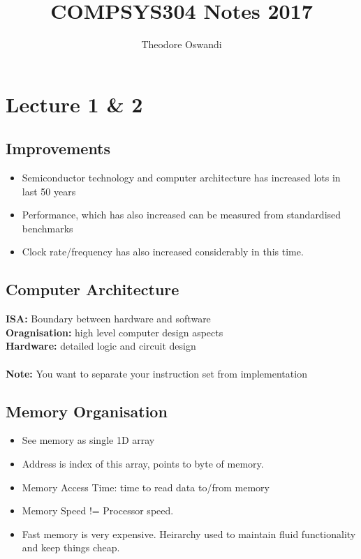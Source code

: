 \documentclass{article}
\title{COMPSYS304 Notes 2017}
\author{Theodore Oswandi}
\newcommand\tab[1][0.5cm]{\hspace*{#1}}
\begin{document}
 \maketitle{} 

\section{Lecture 1 \& 2}
	\subsection{Improvements}
		\begin{itemize}
			\item Semiconductor technology and computer architecture has increased lots in last 50 years
			\item Performance, which has also increased can be measured from standardised benchmarks
			\item Clock rate/frequency has also increased considerably in this time.
		\end{itemize}

	\subsection{Computer Architecture}
		\textbf{\tab ISA:} Boundary between hardware and software\\
		\textbf{\tab Oragnisation:} high level computer design aspects\\
		\textbf{\tab Hardware:} detailed logic and circuit design
		\\ \\
		\textbf{\tab Note:} You want to separate your instruction set from implementation

	\subsection{Memory Organisation}
		\begin{itemize}
			\item See memory as single 1D array
			\item Address is index of this array, points to byte of memory.
			\item Memory Access Time: time to read data to/from memory \\ 
			\item Memory Speed != Processor speed.
			\item Fast memory is very expensive. Heirarchy used to maintain fluid functionality and keep things cheap.
		\end{itemize}
\end{document}
